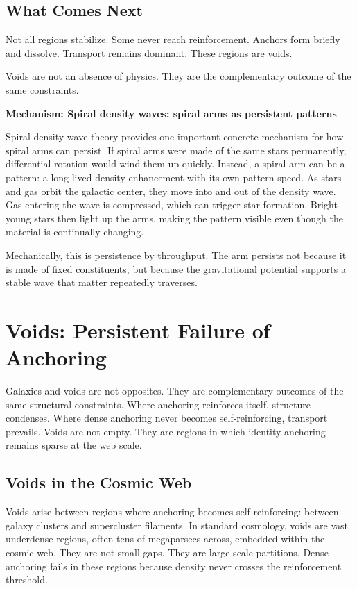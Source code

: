 \documentclass[11pt,twoside,openright]{book}
\newenvironment{mechanismbox}[1]
  {\begin{framed}\noindent\textbf{Mechanism: #1}\par\medskip}
  {\end{framed}}
\begin{document}
\section*{What Comes Next}

Not all regions stabilize. Some never reach reinforcement. Anchors form briefly and dissolve. Transport remains dominant. These regions are voids.

Voids are not an absence of physics. They are the complementary outcome of the same constraints.

\begin{mechanismbox}{Spiral density waves: spiral arms as persistent patterns}

Spiral density wave theory provides one important concrete mechanism for how spiral arms can persist. If spiral arms were made of the same stars permanently, differential rotation would wind them up quickly. Instead, a spiral arm can be a pattern: a long-lived density enhancement with its own pattern speed. As stars and gas orbit the galactic center, they move into and out of the density wave. Gas entering the wave is compressed, which can trigger star formation. Bright young stars then light up the arms, making the pattern visible even though the material is continually changing.

Mechanically, this is persistence by throughput. The arm persists not because it is made of fixed constituents, but because the gravitational potential supports a stable wave that matter repeatedly traverses.

\end{mechanismbox}
\chapter{Voids: Persistent Failure of Anchoring}

Galaxies and voids are not opposites. They are complementary outcomes of the same structural constraints. Where anchoring reinforces itself, structure condenses. Where dense anchoring never becomes self-reinforcing, transport prevails. Voids are not empty. They are regions in which identity anchoring remains sparse at the web scale.

\section*{Voids in the Cosmic Web}

Voids arise between regions where anchoring becomes self-reinforcing: between galaxy clusters and supercluster filaments. In standard cosmology, voids are vast underdense regions, often tens of megaparsecs across, embedded within the cosmic web. They are not small gaps. They are large-scale partitions. Dense anchoring fails in these regions because density never crosses the reinforcement threshold.
\end{document}
